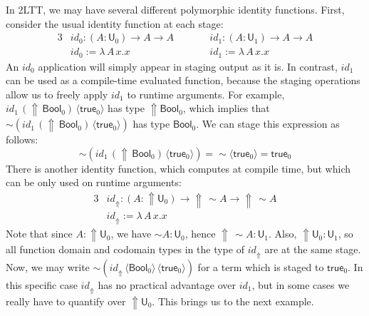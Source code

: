 \documentclass[acmsmall,screen]{acmart}
\newcommand{\mit}[1]{\mathit{#1}}
\newcommand{\msf}[1]{\mathsf{#1}}
\newcommand{\Lift}{{\Uparrow}}
\newcommand{\spl}{{\sim}}
\newcommand{\qut}[1]{\langle #1\rangle}
\newcommand{\U}{\msf{U}}
\newcommand{\Bool}{\msf{Bool}}
\newcommand{\true}{\msf{true}}
\theoremstyle{remark}
\begin{document}
In 2LTT, we may have several different polymorphic identity functions. First,
consider the usual identity function at each stage:
\begin{alignat*}{3}
  & \mit{id}_0 : (A : \U_0) \to A \to A\hspace{2em} && \mit{id}_1 : (A : \U_1) \to A \to A\\
  & \mit{id}_0 := \lambda\,A\,x.x       && \mit{id}_1 := \lambda\,A\,x.x
\end{alignat*}
An $\mit{id}_0$ application will simply appear in staging output as it is. In
contrast, $\mit{id}_1$ can be used as a compile-time evaluated function, because
the staging operations allow us to freely apply $\mit{id}_1$ to runtime
arguments. For example, $\mit{id}_1\,(\Lift\,\Bool_0)\,\qut{\true_0}$ has type
$\Lift \Bool_0$, which implies that $\spl(\mit{id}_1\,(\Lift\,\Bool_0)\,\qut{\true_0})$
has type $\Bool_0$. We can stage this expression as follows:
\[
\spl(\mit{id}_1\,(\Lift\,\Bool_0)\,\qut{\true_0}) = \spl\qut{\true_0} = \true_0
\]
There is another identity function, which computes at compile time, but which
can be only used on runtime arguments:
\begin{alignat*}{3}
  & \mit{id_\Lift} : (A : \Lift\U_0) \to \Lift\,\spl A \to \Lift\,\spl A\\
  & \mit{id_\Lift} := \lambda\,A\,x.x
\end{alignat*}
Note that since $A : \Lift\U_0$, we have $\spl A : \U_0$, hence $\Lift\,\spl A
: \U_1$.  Also, $\Lift\U_0 : \U_1$, so all function domain and codomain types in
the type of $\mit{id_\Lift}$ are at the same stage. Now, we may write
$\spl(\mit{id_\Lift}\,\qut{\Bool_0}\,\qut{\true_0})$ for a term which is staged
to $\true_0$. In this specific case $\mit{id_\Lift}$ has no practical advantage
over $\mit{id}_1$, but in some cases we really have to quantify over
$\Lift\U_0$. This brings us to the next example.
\end{document}
